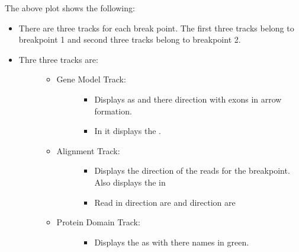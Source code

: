 \documentclass[letterpaper,10pt,english]{sphinxmanual}
\begin{document}
The above plot shows the following:
\begin{itemize}
\item {} 
There are three tracks for each break point. The first three tracks belong to breakpoint 1 and second three tracks belong to breakpoint 2.

\item {} \begin{description}
\item[{Thre three tracks are:}] \leavevmode\begin{itemize}
\item {} \begin{description}
\item[{Gene Model Track:}] \leavevmode\begin{itemize}
\item {} 
Displays  as  and there direction with exons in arrow formation.

\item {} 
In  it displays the .

\end{itemize}

\end{description}

\item {} \begin{description}
\item[{Alignment Track:}] \leavevmode\begin{itemize}
\item {} 
Displays the direction of the reads for the breakpoint. Also displays the  in 

\item {} 
Read in  direction are  and  direction are 

\end{itemize}

\end{description}

\item {} \begin{description}
\item[{Protein Domain Track:}] \leavevmode\begin{itemize}
\item {} 
Displays the  as  with there names in green.

\end{itemize}

\end{description}

\end{itemize}

\end{description}

\end{itemize}
\end{document}
